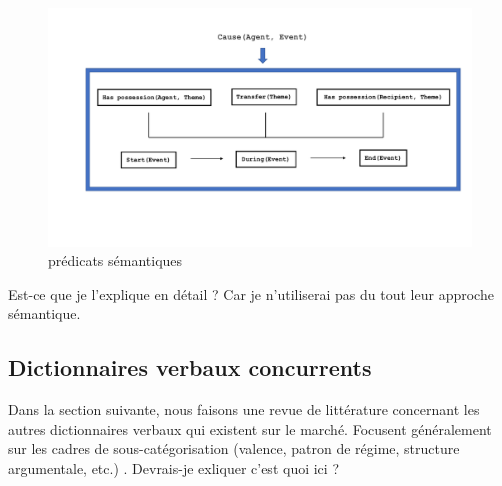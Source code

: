\begin{figure}[h]
	\centering
	\includegraphics[width=1\textwidth, trim = {0cm 2cm 0cm 2cm},clip]{ch3/figs/semantics_give.pdf}
	\caption{prédicats sémantiques}
	\label{fig:Prédicat}
\end{figure}

Est-ce que je l'explique en détail ? Car je n'utiliserai pas du tout leur approche sémantique.


\subsection{Dictionnaires verbaux concurrents}

Dans la section suivante, nous faisons une revue de littérature concernant les autres dictionnaires verbaux qui existent sur le marché. Focusent généralement sur les cadres de sous-catégorisation (valence, patron de régime, structure argumentale, etc.) . Devrais-je exliquer c'est quoi ici ?

